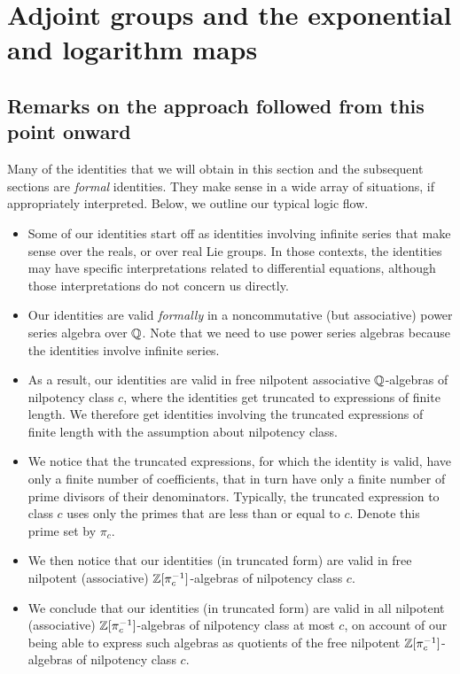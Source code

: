 \section{Adjoint groups and the exponential and logarithm maps}\label{sec:adjoint-exp-log}

\subsection{Remarks on the approach followed from this point onward}

Many of the identities that we will obtain in this section and the
subsequent sections are {\em formal} identities. They make sense in a
wide array of situations, if appropriately interpreted. Below, we
outline our typical logic flow.

\begin{itemize}
\item Some of our identities start off as identities involving
  infinite series that make sense over the reals, or over real Lie
  groups. In those contexts, the identities may have specific
  interpretations related to differential equations, although those
  interpretations do not concern us directly.
\item Our identities are valid {\em formally} in a noncommutative (but
  associative) power series algebra over $\mathbb{Q}$. Note that we need to
  use power series algebras because the identities involve infinite
  series.
\item As a result, our identities are valid in free nilpotent
  associative $\mathbb{Q}$-algebras of nilpotency class $c$, where the
  identities get truncated to expressions of finite length. We
  therefore get identities involving the truncated expressions of
  finite length with the assumption about nilpotency class.
\item We notice that the truncated expressions, for which the identity
  is valid, have only a finite number of coefficients, that in turn
  have only a finite number of prime divisors of their
  denominators. Typically, the truncated expression to class $c$ uses
  only the primes that are less than or equal to $c$. Denote
  this prime set by $\pi_c$.
\item We then notice that our identities (in truncated form) are valid
  in free nilpotent (associative) $\mathbb{Z}[\pi_c^{-1}]$-algebras of
  nilpotency class $c$.
\item We conclude that our identities (in truncated form) are valid in
  all nilpotent (associative) $\mathbb{Z}[\pi_c^{-1}]$-algebras of nilpotency
  class at most $c$, on account of our being able to express such
  algebras as quotients of the free nilpotent $\mathbb{Z}[\pi_c^{-1}]$-algebras
  of nilpotency class $c$.
\end{itemize}


